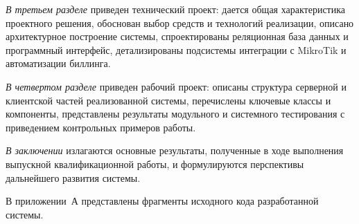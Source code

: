 \emph{В третьем разделе} приведен технический проект: дается общая характеристика проектного решения, обоснован выбор средств и технологий реализации, описано архитектурное построение системы, спроектированы реляционная база данных и программный интерфейс, детализированы подсистемы интеграции с MikroTik и автоматизации биллинга.

\emph{В четвертом разделе} приведен рабочий проект: описаны структура серверной и клиентской частей реализованной системы, перечислены ключевые классы и компоненты, представлены результаты модульного и системного тестирования с приведением контрольных примеров работы.

\emph{В заключении} излагаются основные результаты, полученные в ходе выполнения выпускной квалификационной работы, и формулируются перспективы дальнейшего развития системы.

В приложении~А представлены фрагменты исходного кода разработанной системы.
